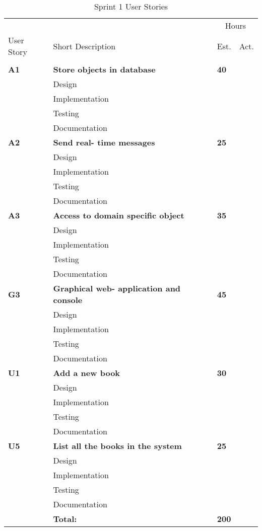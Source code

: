 \begin{table}
\caption{Sprint 1 User Stories}
\centering
\begin{tabular}{ l p{8cm} l l }
\hline 
			&				&\multicolumn{2}{c}{Hours}			\\
 User Story	& Short Description		&Est.		&Act.	                               \\ 
\hline \\ [-2.0ex]
 \bf{A1}     &\bf{Store objects in database}		&\bf{40}		&                                               \\ 
		  &Design							&			&		\\
		  &Implementation							&			&		\\
		  &Testing						&			&		\\
		  &Documentation						&			&		\\

 \bf{A2}     &\bf{Send real- time messages} 		&\bf{25}		&                  \\ 
		  &Design							&			&		\\
		  &Implementation							&			&		\\
		  &Testing						&			&		\\
		  &Documentation						&			&		\\

 \bf{A3}     &\bf{Access to domain specific object} 		&\bf{35}		&		     \\ 
		  &Design							&			&		\\
		  &Implementation							&			&		\\
		  &Testing						&			&		\\
		  &Documentation						&			&		\\

 \bf{G3}     &\bf{Graphical web- application and console}		&\bf{45}		&		     \\ 
		  &Design							&			&		\\
		  &Implementation							&			&		\\
		  &Testing						&			&		\\
		  &Documentation						&			&		\\

 \bf{U1}	   &\bf{Add a new book}		&\bf{30}		&		     \\
		  &Design							&			&		\\
		  &Implementation							&			&		\\
		  &Testing						&			&		\\
		  &Documentation						&			&		\\

 \bf{U5}	   &\bf{List all the books in the system}		&\bf{25}		&		     \\
		  &Design							&			&		\\
		  &Implementation							&			&		\\
		  &Testing						&			&		\\
		  &Documentation						&			&		\\
\hline 
		  &\bf{Total:}			&\bf{200}		&		\\
\hline
\end{tabular}
\label{table:testcasetid01}
\end{table}
